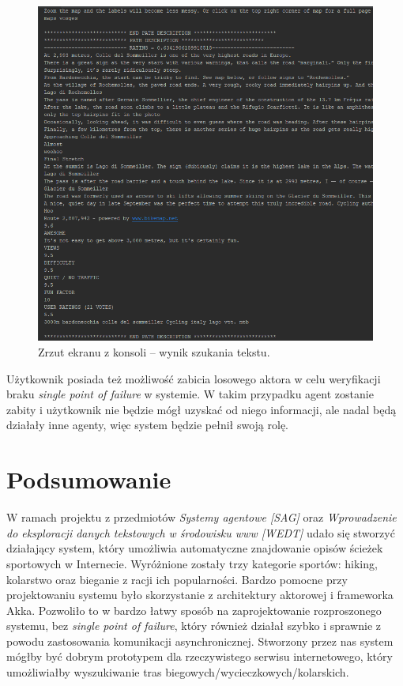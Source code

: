 \documentclass[titlepage]{article}
\begin{document}
\begin{figure}[h!]
\centering
\includegraphics[width=\textwidth]{SS-result.png}
\caption{Zrzut ekranu z konsoli -- wynik szukania tekstu.}
\label{fig:result}
\end{figure}

\FloatBarrier

Użytkownik posiada też możliwość zabicia losowego aktora w celu weryfikacji braku \textit{single point of failure} w systemie. W takim przypadku agent zostanie zabity i użytkownik nie będzie mógł uzyskać od niego informacji, ale nadal będą działały inne agenty, więc system będzie pełnił swoją rolę.

\section{Podsumowanie}

W ramach projektu z przedmiotów \textit{Systemy agentowe [SAG]} oraz \textit{Wprowadzenie do eksploracji danych tekstowych w środowisku www [WEDT]} udało się stworzyć działający system, który umożliwia automatyczne znajdowanie opisów ścieżek sportowych w Internecie. Wyróżnione zostały trzy kategorie sportów: hiking, kolarstwo oraz bieganie z racji ich popularności. Bardzo pomocne przy projektowaniu systemu było skorzystanie z architektury aktorowej i frameworka Akka. Pozwoliło to w bardzo łatwy sposób na zaprojektowanie rozproszonego systemu, bez \textit{single point of failure}, który również działał szybko i sprawnie z powodu zastosowania komunikacji asynchronicznej. Stworzony przez nas system mógłby być dobrym prototypem dla rzeczywistego serwisu internetowego, który umożliwiałby wyszukiwanie tras biegowych/wycieczkowych/kolarskich.
\end{document}
